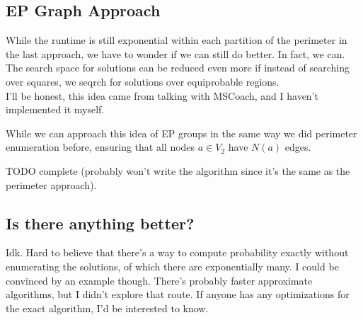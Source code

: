 \subsection{EP Graph Approach}

While the runtime is still exponential within each partition of the perimeter in the last approach, we have to wonder if we can still do better. In fact, we can. The search space for solutions can be reduced even more if instead of searching over squares, we seqrch for solutions over equiprobable regions.\\

I'll be honest, this idea came from talking with MSCoach, and I haven't implemented it myself.




While we can approach this idea of EP groups in the same way we did perimeter enumeration before, ensuring that all nodes $a\in V_2$ have $N(a)$ edges.

TODO complete (probably won't write the algorithm since it's the same as the perimeter approach).\\


\subsection*{Is there anything better?}

Idk. Hard to believe that there's a way to compute probability exactly without enumerating the solutions, of which there are exponentially many. I could be convinced by an example though. There's probably faster approximate algorithms, but I didn't explore that route. If anyone has any optimizations for the exact algorithm, I'd be interested to know.\\